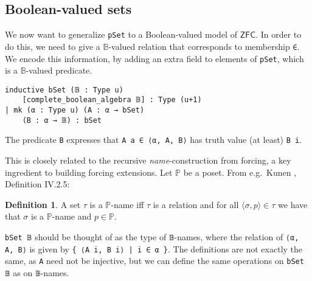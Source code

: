 \documentclass[sigplan,10pt,review, autoref,anonymous]{acmart}
\newcommand{\B}{\mathbb{B}}
\newcommand{\lil}{\lstinline}
\newcommand{\ZFC}{\mathsf{ZFC}}
\theoremstyle{definition}
\newtheorem{defn}{Definition}[section]
\begin{document}
\subsection{Boolean-valued sets}
\label{subsection:bset:bset}
We now want to generalize \lil{pSet} to a Boolean-valued model of \(\ZFC\). In order to do this, we need to give a
\(\B\)-valued relation that corresponds to membership \lil{∈}. We encode this information, by adding an extra field to elements of \lil{pSet}, which is a \(\B\)-valued predicate.
\begin{lstlisting}
inductive bSet (𝔹 : Type u)
    [complete_boolean_algebra 𝔹] : Type (u+1)
| mk (α : Type u) (A : α → bSet)
    (B : α → 𝔹) : bSet
\end{lstlisting}
The predicate \lil{B} expresses that \lil{A a ∈ ⟨α, A, B⟩} has truth value (at least) \lil{B i}.

This is closely related to the recursive \emph{name}-construction from forcing, a key ingredient to building forcing extensions. Let \(\mathbb{P}\) be a poset. From e.g.\ Kunen \cite{kunen2014set}, Definition IV.2.5:
\begin{defn}
  A set \(\tau\) is a \(\mathbb{P}\)-name iff \(\tau\) is a relation and for all \(\langle  \sigma, p\rangle \in \tau\) we have that \(\sigma\) is a \(\mathbb{P}\)-name and \(p \in \mathbb{P}\).
\end{defn}
\lstinline{bSet 𝔹} should be thought of as the type of \lstinline{𝔹}-names, where the relation of \lil{⟨α, A, B⟩} is given by \lstinline"{ ⟨A i, B i⟩ | i ∈ α }".
The definitions are not exactly the same, as \lil{A} need not be injective, but we can define the same operations on \lil{bSet 𝔹} as on \lil{𝔹}-names.

\end{document}

